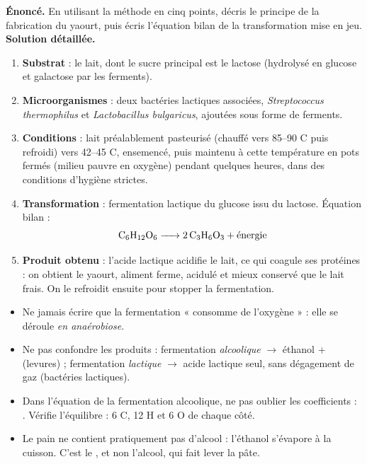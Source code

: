 \documentclass[11pt]{article}
\begin{document}
\begin{exoresolu}
\textbf{Énoncé.} En utilisant la méthode en cinq points, décris le principe de la fabrication du yaourt, puis écris l'équation bilan de la transformation mise en jeu.
\tcblower
\textbf{Solution détaillée.}
\begin{enumerate}
\item \textbf{Substrat} : le lait, dont le sucre principal est le lactose (hydrolysé en glucose et galactose par les ferments).
\item \textbf{Microorganismes} : deux bactéries lactiques associées, \emph{Streptococcus thermophilus} et \emph{Lactobacillus bulgaricus}, ajoutées sous forme de ferments.
\item \textbf{Conditions} : lait préalablement pasteurisé (chauffé vers 85--90 \textdegree C puis refroidi) vers 42--45 \textdegree C, ensemencé, puis maintenu à cette température en pots fermés (milieu pauvre en oxygène) pendant quelques heures, dans des conditions d'hygiène strictes.
\item \textbf{Transformation} : fermentation lactique du glucose issu du lactose. Équation bilan :
\[ \ce{C6H12O6 -> 2 C3H6O3} + \text{énergie} \]
\item \textbf{Produit obtenu} : l'acide lactique acidifie le lait, ce qui coagule ses protéines : on obtient le yaourt, aliment ferme, acidulé et mieux conservé que le lait frais. On le refroidit ensuite pour stopper la fermentation.
\end{enumerate}
\end{exoresolu}

\begin{attention}
\begin{itemize}
\item Ne jamais écrire que la fermentation « consomme de l'oxygène » : elle se déroule \emph{en anaérobiose}.
\item Ne pas confondre les produits : fermentation \emph{alcoolique} $\rightarrow$ éthanol +  (levures) ; fermentation \emph{lactique} $\rightarrow$ acide lactique seul, sans dégagement de gaz (bactéries lactiques).
\item Dans l'équation de la fermentation alcoolique, ne pas oublier les coefficients : . Vérifie l'équilibre : 6 C, 12 H et 6 O de chaque côté.
\item Le pain ne contient pratiquement pas d'alcool : l'éthanol s'évapore à la cuisson. C'est le , et non l'alcool, qui fait lever la pâte.
\end{itemize}
\end{attention}
\end{document}

